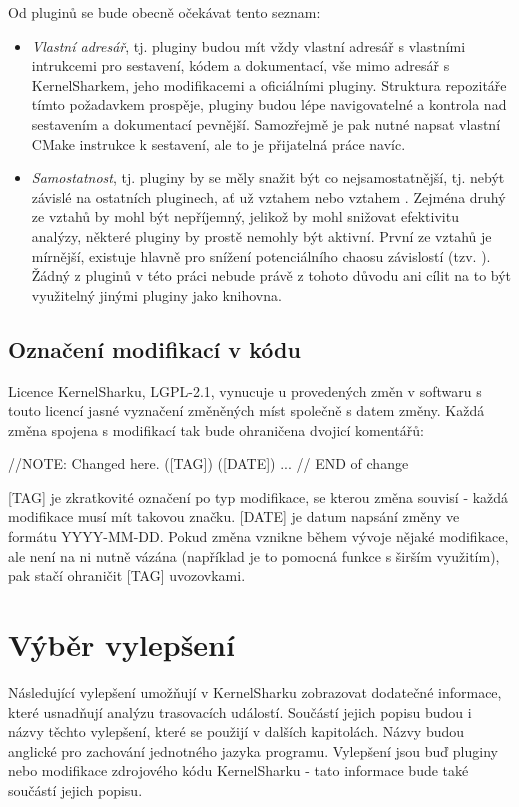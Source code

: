 Od pluginů se bude obecně očekávat tento seznam:
\begin{itemize}
    \item \emph{Vlastní adresář}, tj. pluginy budou mít vždy vlastní adresář s vlastními intrukcemi pro sestavení, kódem a dokumentací, vše mimo adresář s KernelSharkem, jeho modifikacemi a oficiálními pluginy. Struktura repozitáře tímto požadavkem prospěje, pluginy budou lépe navigovatelné a kontrola nad sestavením a dokumentací pevnější. Samozřejmě je pak nutné napsat vlastní CMake instrukce k sestavení, ale to je přijatelná práce navíc.
    \item \emph{Samostatnost}, tj. pluginy by se měly snažit být co nejsamostatnější, tj. nebýt závislé na ostatních pluginech, ať už vztahem  nebo vztahem . Zejména druhý ze vztahů by mohl být nepříjemný, jelikož by mohl snižovat efektivitu analýzy, některé pluginy by prostě nemohly být aktivní. První ze vztahů je mírnější, existuje hlavně pro snížení potenciálního chaosu závislostí (tzv. ). Žádný z pluginů v této práci nebude právě z tohoto důvodu ani cílit na to být využitelný jinými pluginy jako knihovna.
\end{itemize}

\subsection{Označení modifikací v kódu}
Licence KernelSharku, LGPL-2.1, vynucuje u provedených změn v softwaru s touto licencí jasné vyznačení změněných míst společně s datem změny. Každá změna spojena s modifikací tak bude ohraničena dvojicí komentářů:
\begin{code}
    //NOTE: Changed here. ([TAG]) ([DATE])
    ...
    // END of change
\end{code}
[TAG] je zkratkovité označení po typ modifikace, se kterou změna souvisí - každá modifikace musí mít takovou značku. [DATE] je datum napsání změny ve formátu YYYY-MM-DD. Pokud změna vznikne během vývoje nějaké modifikace, ale není na ni nutně vázána (například je to pomocná funkce s širším využitím), pak stačí ohraničit [TAG] uvozovkami.

\section{Výběr vylepšení}
Následující vylepšení umožňují v KernelSharku zobrazovat dodatečné informace, které usnadňují analýzu trasovacích událostí. Součástí jejich popisu budou i názvy těchto vylepšení, které se použijí v dalších kapitolách. Názvy budou anglické pro zachování jednotného jazyka programu. Vylepšení jsou buď pluginy nebo modifikace zdrojového kódu KernelSharku - tato informace bude také součástí jejich popisu.

